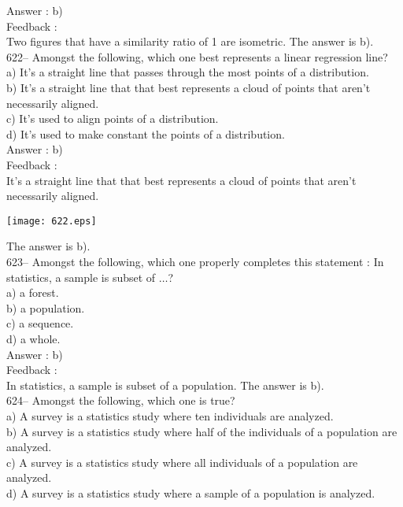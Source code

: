 \documentclass[letterpaper, 12pt]{article}
\begin{document}
Answer : b) \\

Feedback : \\
Two figures that have a similarity ratio of 1 are isometric. The answer is b).\\


622-- Amongst the following, which one best represents a linear regression line?\\
a) It's a straight line that passes through the most points of a distribution.\\
b) It's a straight line that that best represents a cloud of points that aren't necessarily aligned.\\
c) It's used to align points of a distribution.\\
d) It's used to make constant the points of a distribution.\\

Answer : b)\\

Feedback : \\
It's a straight line that that best represents a cloud of points that aren't necessarily aligned.
   \begin{center}
    \texttt{[image: 622.eps]}
    \end{center}  The answer is b).\\


623-- Amongst the following, which one properly completes this statement : \og In statistics, a sample is subset of $\ldots$\fg ?\\
a) a forest.\\
b) a population.\\
c) a sequence.\\
d) a whole.\\

Answer : b)\\

Feedback : \\
In statistics, a sample is subset of a population. The answer is b).\\

624-- Amongst the following, which one is true?\\
a) A survey is a statistics study where ten individuals are analyzed.\\
b) A survey is a statistics study where half of the individuals of a population are analyzed.\\
c) A survey is a statistics study where all individuals of a population are analyzed.\\
d) A survey is a statistics study where a sample of a population is analyzed.\\
\end{document}
